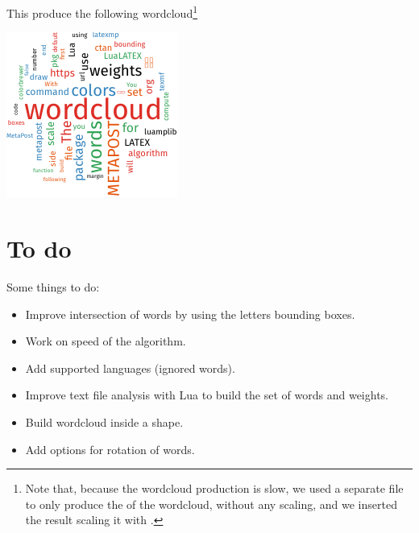 \documentclass[english]{ltxdoc}
\begin{document}
This produce the following wordcloud\footnote{Note that, because the wordcloud
production is slow, we used a separate file to only produce the \pdf{} of the
wordcloud, without any scaling, and we inserted the result scaling it with \cite{ctan-graphicx}.} 
\begin{center}
  \includegraphics[width=\linewidth]{doc-wc.pdf}
\end{center}

\section{To do}

Some things to do:
\begin{itemize}
  \item Improve intersection of words by using the letters bounding boxes.
  \item Work on speed of the algorithm.
  \item Add supported languages (ignored words).
  \item Improve text file analysis with Lua to build the set of words and
  weights.  
  \item Build wordcloud inside a shape.
  \item Add options for rotation of words.
\end{itemize}

\printbibliography
\printindex
\newpage
\end{document}
